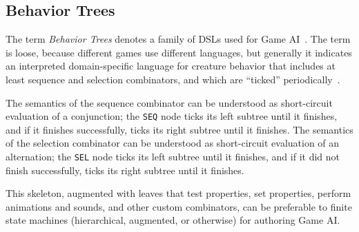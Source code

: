 \documentclass{acm_proc_article-sp}
\newcommand{\code}[1] {{\small{\texttt{#1}}}}
\begin{document}

\subsection{Behavior Trees}

The term \emph{Behavior Trees} denotes a family of DSLs used for Game 
AI~\cite{TODO}.
The term is loose, because different games use different languages,
but generally it indicates an interpreted domain-specific language
for creature behavior that includes at least sequence and selection combinators,
and which are ``ticked'' periodically~\cite{TODO}.


The semantics of the sequence combinator can be understood as short-circuit evaluation of a conjunction;
the \code{SEQ} node ticks its left subtree until it finishes,
and if it finishes successfully, ticks its right subtree until it finishes.
The semantics of the selection combinator can be understood as short-circuit evaluation of an alternation;
the \code{SEL} node ticks its left subtree until it finishes,
and if it did not finish successfully, ticks its right subtree until it finishes.

This skeleton, augmented with leaves that test properties, set properties, perform animations and sounds,
and other custom combinators, can be preferable to finite state machines (hierarchical, augmented, or otherwise) for authoring Game AI.
\end{document}
